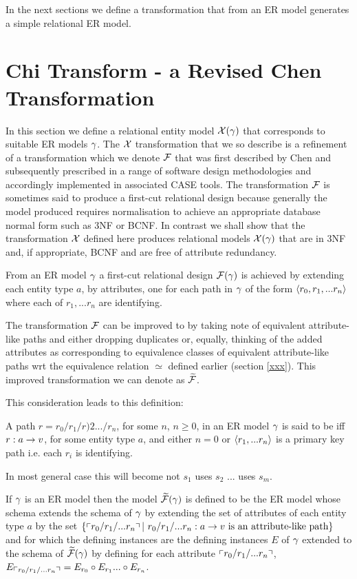 In the next sections we define a transformation that from an ER model generates a simple relational ER model.

\section{Chi Transform - a Revised Chen Transformation}
In this section we define a relational  entity model $\mathcal{X}(\gamma)$ that corresponds
to suitable ER models $\gamma$. The $\mathcal{X}$ transformation that we so describe is a refinement
of a transformation which we denote $\mathcal{F}$ that was first described by Chen and subsequently prescribed in a range of software design methodologies and accordingly implemented in associated CASE tools. The transformation $\mathcal{F}$ is sometimes said to produce a first-cut relational design because generally the model produced requires normalisation
to achieve an appropriate database normal form such as 3NF or BCNF. 
In contrast we shall show that the transformation $\mathcal{X}$ defined here produces relational models $\mathcal{X}(\gamma)$ that are in 3NF and, if appropriate, BCNF and are free of attribute redundancy.

From an ER model $\gamma$ a first-cut relational design $\mathcal{F}(\gamma)$ is achieved by extending each
entity type $a$, by attributes,  one for each path in $\gamma$ of the 
form $\langle r_0,r_1,...r_n\rangle$ where each of $r_1,...r_n$ are identifying. 

The transformation $\mathcal{F}$ can be improved to by taking note of equivalent attribute-like paths and
either dropping duplicates or, equally, thinking of the added attributes as corresponding to equivalence classes of 
equivalent attribute-like paths wrt the equivalence relation $\simeq$ defined earlier (section \ref{xxx}). This improved transformation we can denote as $\mathcal{\widetilde{F}}$.

This consideration leads  to this definition:
\begin{definition}
A path $r=r_0/r_1/r)2.../r_n$, for some $n$, $n \geq 0$, in an ER model $\gamma$ is 
said to be  iff $r: a \rightarrow v$, for some entity type $a$,
and either $n=0$ or $\langle r_1,...r_n\rangle$ is a primary key path i.e. each $r_i$ is identifying.
\end{definition}
\begin{noteforfuture}
In most general case this will become not $s_1$ uses $s_2$ ... uses $s_m$.
\end{noteforfuture}
If $\gamma$ is an ER model then the model $\mathcal{\widetilde{F}}(\gamma)$ is defined to be the ER model whose schema extends the schema of $\gamma$
by extending the set of attributes of each entity type $a$ by the set 
$\set{\qq{r_0/r_1/...r_n}  | \ r_0/r_1/...r_n: a \morph \veee \mbox{ is an attribute-like path}}$ and for which the defining instances are the defining  instances $E$ of $\gamma$ extended to the schema of $\mathcal{\widetilde{F}}(\gamma)$ by defining for each attribute $\left\ulcorner r_0/r_1/...r_n\right\urcorner$, $E_{\left\ulcorner r_0/r_1/...r_n\right\urcorner} = E_{r_0} \circ E_{r_1}... \circ E_{r_n}$.

